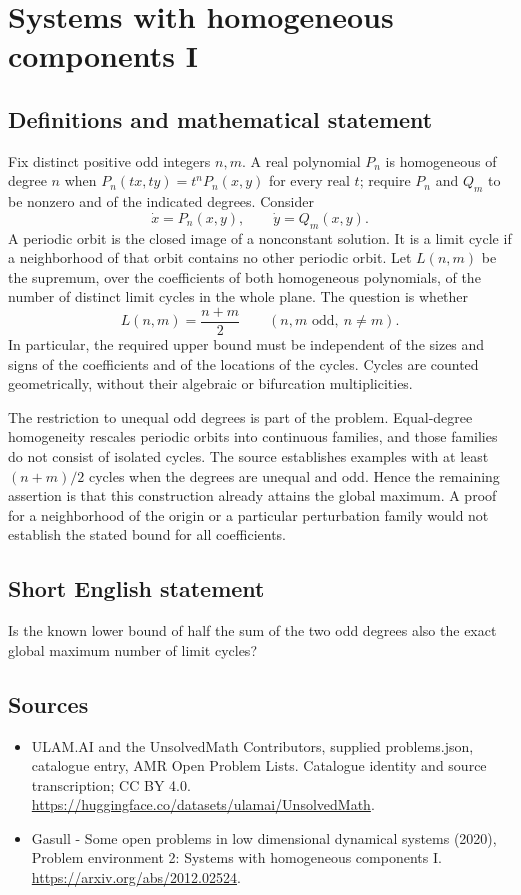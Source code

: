 \documentclass[11pt,a4paper]{article}
\begin{document}
\section*{Systems with homogeneous components I}\label{statement}

\subsection{Definitions and mathematical statement}
Fix distinct positive odd integers $n,m$. A real polynomial $P_n$ is homogeneous
of degree $n$ when $P_n(tx,ty)=t^nP_n(x,y)$ for every real $t$; require $P_n$
and $Q_m$ to be nonzero and of the indicated degrees. Consider
\[
 \dot x=P_n(x,y),\qquad \dot y=Q_m(x,y).
\]
A periodic orbit is the closed image of a nonconstant solution. It is a
limit cycle if a neighborhood of that orbit contains no other periodic orbit.
Let $L(n,m)$ be the supremum, over the coefficients of both homogeneous
polynomials, of the number of distinct limit cycles in the whole plane.
The question is whether
\[
 L(n,m)=\frac{n+m}{2}\qquad(n,m\text{ odd},\ n\ne m).
\]
In particular, the required upper bound must be independent of the sizes and
signs of the coefficients and of the locations of the cycles. Cycles are
counted geometrically, without their algebraic or bifurcation multiplicities.

The restriction to unequal odd degrees is part of the problem. Equal-degree
homogeneity rescales periodic orbits into continuous families, and those
families do not consist of isolated cycles. The source establishes examples
with at least $(n+m)/2$ cycles when the degrees are unequal and odd. Hence
the remaining assertion is that this construction already attains the global
maximum. A proof for a neighborhood of the origin or a particular perturbation
family would not establish the stated bound for all coefficients.
\subsection{Short English statement}
Is the known lower bound of half the sum of the two odd degrees also the exact global maximum number of limit cycles?
\subsection{Sources}
\begin{itemize}
\item[S1] ULAM.AI and the UnsolvedMath Contributors, supplied problems.json, catalogue entry, AMR Open Problem Lists. Catalogue identity and source transcription; CC BY 4.0.
\url{https://huggingface.co/datasets/ulamai/UnsolvedMath}.
\item[S2] Gasull - Some open problems in low dimensional dynamical systems (2020), Problem environment 2: Systems with homogeneous components I. 
\url{https://arxiv.org/abs/2012.02524}.
\end{itemize}
\end{document}
